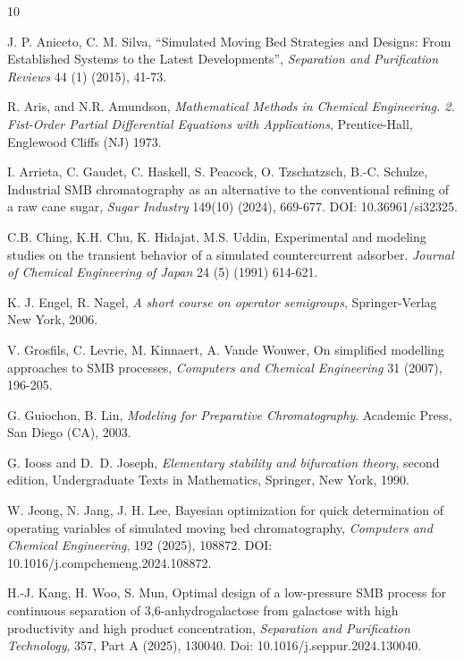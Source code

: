 \documentclass[a4paper]{article}
\numberwithin{equation}{section}
\begin{document}
\begin{thebibliography}{10}

J. P. Aniceto, C. M. Silva, ``Simulated Moving Bed Strategies and Designs: From Established Systems to the Latest Developments'', {\it Separation and Purification Reviews } 44 (1) (2015), 41-73.

R. Aris, and N.R. Amundson, {\it Mathematical Methods in Chemical Engineering. 2. Fist-Order Partial Differential Equations with Applications}, Prentice-Hall, Englewood Cliffs (NJ) 1973.

I. Arrieta, C. Gaudet, C. Haskell, S. Peacock, O. Tzschatzsch, B.-C. Schulze, Industrial SMB chromatography as an alternative to the conventional refining of a raw cane sugar, {\it Sugar Industry} 149(10) (2024), 669-677. DOI: 10.36961/si32325.


C.B. Ching, K.H. Chu, K. Hidajat, M.S. Uddin, Experimental and modeling studies on the transient behavior of a simulated countercurrent adsorber. \textit{Journal of Chemical Engineering of Japan} {24} (5) (1991) 614-621.

K. J. Engel, R. Nagel, {\it A short course on operator semigroups}, Springer-Verlag New York, 2006.

V. Grosfils, C. Levrie, M. Kinnaert, A. Vande Wouwer, On simplified modelling approaches to SMB processes,
{\it Computers and Chemical Engineering} 31 (2007), 196-205.

G. Guiochon, B. Lin, {\it Modeling for Preparative Chromatography}. Academic Press, San Diego (CA), 2003.


G. Iooss and D.~D. Joseph, {\it Elementary stability and bifurcation theory}, second edition,
Undergraduate Texts in Mathematics, Springer, New York, 1990.

W. Jeong, N. Jang, J. H. Lee,
Bayesian optimization for quick determination of operating variables of simulated moving bed chromatography,
{\it Computers and Chemical Engineering},
192 (2025), 108872. DOI: 10.1016/j.compchemeng.2024.108872.

H.-J. Kang, H. Woo, S. Mun,
Optimal design of a low-pressure SMB process for continuous separation of 3,6-anhydrogalactose from galactose with high productivity and high product concentration,
{\it Separation and Purification Technology}, 357, Part A (2025), 130040.
Doi: 10.1016/j.seppur.2024.130040.


\end{thebibliography}
\end{document}
